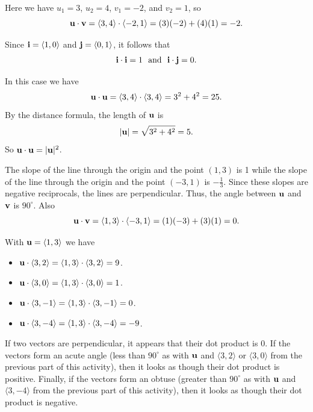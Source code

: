 \begin{activitySolution}
    \ba
  \item Here we have $u_1=3$, $u_2=4$, $v_1=-2$, and $v_2=1$, so 
\[\mathbf{u} \cdot \mathbf{v} = \langle 3, 4\rangle \cdot \langle -2, 1\rangle = (3)(-2)+(4)(1) = -2.\]

  \item Since $\mathbf{i} = \langle 1,0 \rangle$ and $\mathbf{j} = \langle 0,1 \rangle$, it follows that 
\[\mathbf{i}\cdot\mathbf{i} = 1 \ \text{ and } \ \mathbf{i}\cdot\mathbf{j} = 0.\]

  \item In this case we have 
\[\mathbf{u} \cdot \mathbf{u} = \langle 3, 4\rangle \cdot \langle 3, 4\rangle = 3^2+4^2 = 25.\]
By the distance formula, the length of $\mathbf{u}$ is 
\[|\mathbf{u}| = \sqrt{3^2+4^2} = 5.\]
So $\mathbf{u} \cdot \mathbf{u} = |\mathbf{u}|^2$. 

  \item The slope of the line through the origin and the point $(1,3)$ is 1 while the slope of the line through the origin and the point $(-3,1)$ is $-\frac{1}{3}$. Since these slopes are negative reciprocals, the lines are perpendicular. Thus, the angle between $\mathbf{u}$ and $\mathbf{v}$ is $90^{\circ}$. Also
\[\mathbf{u} \cdot \mathbf{v} = \langle 1, 3\rangle \cdot \langle -3, 1\rangle = (1)(-3)+(3)(1) = 0.\]

  \item With $\mathbf{u}=\langle 1, 3\rangle$ we have 
    \begin{itemize}
      \item $\mathbf{u} \cdot \langle 3, 2 \rangle = \langle 1, 3\rangle \cdot \langle 3, 2 \rangle = 9$.
      \item $\mathbf{u} \cdot \langle 3, 0 \rangle = \langle 1, 3\rangle \cdot \langle 3, 0 \rangle = 1$.
      \item $\mathbf{u} \cdot \langle 3, -1 \rangle = \langle 1, 3\rangle \cdot \langle 3, -1 \rangle = 0$.
      \item $\mathbf{u} \cdot \langle 3, -4 \rangle = \langle 1, 3\rangle \cdot \langle 3, -4 \rangle = -9$.
      \end{itemize}

    \item If two vectors are perpendicular, it appears that their dot product is 0. If the vectors form an acute angle (less than $90^{\circ}$ as with $\mathbf{u}$ and $\langle 3,2 \rangle$ or $\langle 3,0 \rangle$ from the previous part of this activity), then it looks as though their dot product is positive. Finally, if the vectors form an obtuse (greater than $90^{\circ}$ as with $\mathbf{u}$ and $\langle 3,-4 \rangle$ from the previous part of this activity), then it looks as though their dot product is negative. 
    \ea
\end{activitySolution}

\afterpa 